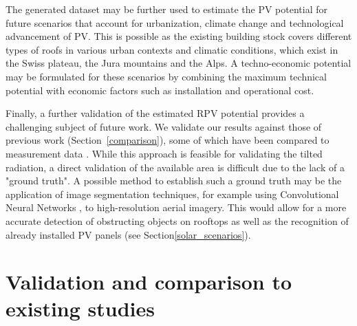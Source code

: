 The generated dataset may be further used to estimate the PV potential for future scenarios that account for urbanization, climate change and technological advancement of PV.
This is possible as the existing building stock covers different types of roofs in various urban contexts and climatic conditions, which exist in the Swiss plateau, the Jura mountains and the Alps. 
A techno-economic potential may be formulated for these scenarios by combining the maximum technical potential with economic factors such as installation and operational cost.

Finally, a further validation of the estimated RPV potential provides a challenging subject of future work. 
We validate our results against those of previous work (Section~\ref{comparison}), some of which have been compared to measurement data \cite{buffat_scalable_2018}. While this approach is feasible for validating the tilted radiation, a direct validation of the available area is difficult due to the lack of a "ground truth". A possible method to establish such a ground truth may be the application of image segmentation techniques, for example using Convolutional Neural Networks \cite{castello_deep_2019}, to high-resolution aerial imagery. 
This would allow for a more accurate detection of obstructing objects on rooftops as well as the recognition of already installed PV panels (see Section\ref{solar_scenarios}).



\section{Validation and comparison to existing studies}
\label{solar_comparison}

